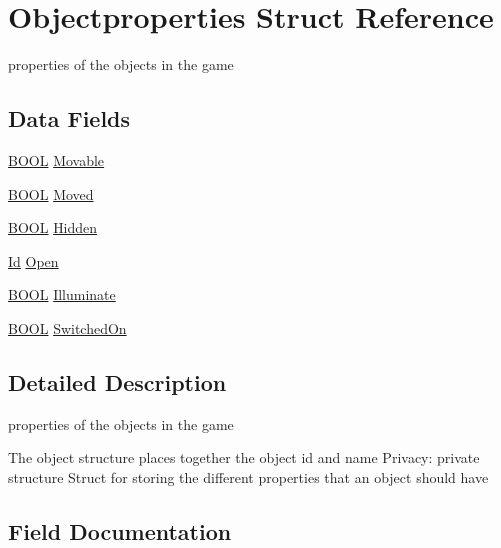 \hypertarget{structObjectproperties}{}\section{Objectproperties Struct Reference}
\label{structObjectproperties}


properties of the objects in the game  


\subsection*{Data Fields}
\begin{DoxyCompactItemize}
\item 
\hyperlink{types_8h_a3e5b8192e7d9ffaf3542f1210aec18dd}{B\+O\+OL} \hyperlink{structObjectproperties_a565388c789e2f3333f0de535e19ac0fd}{Movable}
\item 
\hyperlink{types_8h_a3e5b8192e7d9ffaf3542f1210aec18dd}{B\+O\+OL} \hyperlink{structObjectproperties_a95af66b2771daa4b3509b28fb6ce904f}{Moved}
\item 
\hyperlink{types_8h_a3e5b8192e7d9ffaf3542f1210aec18dd}{B\+O\+OL} \hyperlink{structObjectproperties_ac7b53b9dc45c682287bf8a81ac29f5ea}{Hidden}
\item 
\hyperlink{types_8h_a845e604fb28f7e3d97549da3448149d3}{Id} \hyperlink{structObjectproperties_a346e3a6d314b69a30c356800c31ca3a0}{Open}
\item 
\hyperlink{types_8h_a3e5b8192e7d9ffaf3542f1210aec18dd}{B\+O\+OL} \hyperlink{structObjectproperties_ab32cc1dcd3dcb84df653c09d0560fe84}{Illuminate}
\item 
\hyperlink{types_8h_a3e5b8192e7d9ffaf3542f1210aec18dd}{B\+O\+OL} \hyperlink{structObjectproperties_a53e5cff11358955ab939ac4066aee6ff}{Switched\+On}
\end{DoxyCompactItemize}


\subsection{Detailed Description}
properties of the objects in the game 

The object structure places together the object id and name Privacy\+: private structure Struct for storing the different properties that an object should have 

\subsection{Field Documentation}
